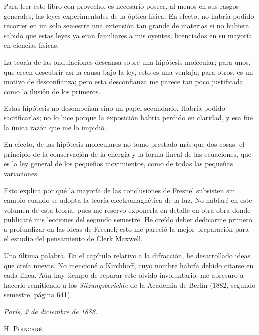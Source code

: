 Para leer este libro con provecho, es necesario poseer, al menos en sus
rasgos generales, las leyes experimentales de la óptica física. En
efecto, no habría podido recorrer en un solo semestre una extensión tan
grande de materias si no hubiera sabido que estas leyes ya eran familiares
a mis oyentes, licenciados en su mayoría en ciencias físicas.

La teoría de las ondulaciones descansa sobre una hipótesis molecular; para
unos, que creen descubrir así la causa bajo la ley, esto es una ventaja;
para otros, es un motivo de desconfianza; pero esta desconfianza me parece
tan poco justificada como la ilusión de los primeros.

Estas hipótesis no desempeñan sino un papel secundario. Habría podido
sacrificarlas; no lo hice porque la exposición habría perdido en claridad,
y esa fue la única razón que me lo impidió.

En efecto, de las hipótesis moleculares no tomo prestado más que dos
cosas: el principio de la conservación de la energía y la forma lineal de
las ecuaciones, que es la ley general de los pequeños movimientos, como de
todas las pequeñas variaciones.

Esto explica por qué la mayoría de las conclusiones de Fresnel subsisten
sin cambio cuando se adopta la teoría electromagnética de la luz. No
hablaré en este volumen de esta teoría, pues me reservo exponerla en
detalle en otra obra donde publicaré mis lecciones del segundo semestre.
He creído deber dedicarme primero a profundizar en las ideas de Fresnel;
esto me pareció la mejor preparación para el estudio del pensamiento de
Clerk Maxwell.

Una última palabra. En el capítulo relativo a la difracción, he
desarrollado ideas que creía nuevas. No mencioné a Kirchhoff, cuyo nombre
habría debido citarse en cada línea. Aún hay tiempo de reparar este olvido
involuntario; me apresuro a hacerlo remitiendo a los \emph{Sitzungsberichte}
de la Academia de Berlín (1882, segundo semestre, página 641).

\bigskip
\noindent\textit{París, 2 de diciembre de 1888.}

\bigskip
\noindent\textsc{H. Poincaré.}
